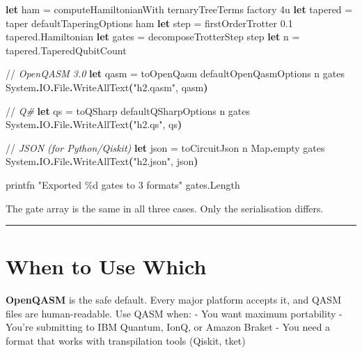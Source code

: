 \documentclass[
  11pt,
  oneside]{book}
\newenvironment{Shaded}{\begin{snugshade}}{\end{snugshade}}
\newcommand{\CommentTok}[1]{\textcolor[rgb]{0.56,0.35,0.01}{\textit{#1}}}
\newcommand{\DecValTok}[1]{\textcolor[rgb]{0.00,0.00,0.81}{#1}}
\newcommand{\FloatTok}[1]{\textcolor[rgb]{0.00,0.00,0.81}{#1}}
\newcommand{\KeywordTok}[1]{\textcolor[rgb]{0.13,0.29,0.53}{\textbf{#1}}}
\newcommand{\NormalTok}[1]{#1}
\newcommand{\OperatorTok}[1]{\textcolor[rgb]{0.81,0.36,0.00}{\textbf{#1}}}
\newcommand{\StringTok}[1]{\textcolor[rgb]{0.31,0.60,0.02}{#1}}
\begin{document}
\begin{Shaded}
\begin{Highlighting}[]
\KeywordTok{let}\NormalTok{ ham = computeHamiltonianWith ternaryTreeTerms factory }\DecValTok{4}\NormalTok{u}
\KeywordTok{let}\NormalTok{ tapered = taper defaultTaperingOptions ham}
\KeywordTok{let}\NormalTok{ step = firstOrderTrotter }\FloatTok{0.1}\NormalTok{ tapered.Hamiltonian}
\KeywordTok{let}\NormalTok{ gates = decomposeTrotterStep step}
\KeywordTok{let}\NormalTok{ n = tapered.TaperedQubitCount}

\NormalTok{//}\CommentTok{ OpenQASM 3.0}
\KeywordTok{let}\NormalTok{ qasm = toOpenQasm defaultOpenQasmOptions n gates}
\NormalTok{System}\KeywordTok{.}\NormalTok{IO}\KeywordTok{.}\NormalTok{File}\KeywordTok{.}\NormalTok{WriteAllText}\OperatorTok{(}\StringTok{"h2.qasm"}\NormalTok{, qasm}\OperatorTok{)}

\NormalTok{//}\CommentTok{ Q\#}
\KeywordTok{let}\NormalTok{ qs = toQSharp defaultQSharpOptions n gates}
\NormalTok{System}\KeywordTok{.}\NormalTok{IO}\KeywordTok{.}\NormalTok{File}\KeywordTok{.}\NormalTok{WriteAllText}\OperatorTok{(}\StringTok{"h2.qs"}\NormalTok{, qs}\OperatorTok{)}

\NormalTok{//}\CommentTok{ JSON (for Python/Qiskit)}
\KeywordTok{let}\NormalTok{ json = toCircuitJson n Map}\KeywordTok{.}\NormalTok{empty gates}
\NormalTok{System}\KeywordTok{.}\NormalTok{IO}\KeywordTok{.}\NormalTok{File}\KeywordTok{.}\NormalTok{WriteAllText}\OperatorTok{(}\StringTok{"h2.json"}\NormalTok{, json}\OperatorTok{)}

\NormalTok{printfn }\StringTok{"Exported \%d gates to 3 formats"}\NormalTok{ gates.Length}
\end{Highlighting}
\end{Shaded}

The gate array is the same in all three cases. Only the serialisation
differs.

\begin{center}\rule{0.5\linewidth}{0.5pt}\end{center}

\section{When to Use Which}\label{when-to-use-which}

\textbf{OpenQASM} is the safe default. Every major platform accepts it,
and QASM files are human-readable. Use QASM when: - You want maximum
portability - You're submitting to IBM Quantum, IonQ, or Amazon Braket -
You need a format that works with transpilation tools (Qiskit, tket)
\end{document}
